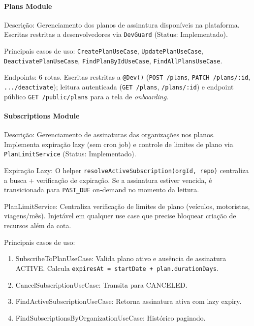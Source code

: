 \paragraph{Plans Module}

Descrição: Gerenciamento dos planos de assinatura disponíveis na plataforma. Escritas restritas a desenvolvedores via \texttt{DevGuard} (Status: Implementado).

Principais casos de uso: \texttt{CreatePlanUseCase}, \texttt{UpdatePlanUseCase}, \texttt{DeactivatePlanUseCase}, \texttt{FindPlanByIdUseCase}, \texttt{FindAllPlansUseCase}.

Endpoints: 6 rotas. Escritas restritas a \texttt{@Dev()} (\texttt{POST /plans}, \texttt{PATCH /plans/:id}, \texttt{.../deactivate}); leitura autenticada (\texttt{GET /plans}, \texttt{/plans/:id}) e endpoint público \texttt{GET /public/plans} para a tela de \textit{onboarding}.

\paragraph{Subscriptions Module}

Descrição: Gerenciamento de assinaturas das organizações nos planos. Implementa expiração lazy (sem cron job) e controle de limites de plano via \texttt{PlanLimitService} (Status: Implementado).

Expiração Lazy: O helper \texttt{resolveActiveSubscription(orgId, repo)} centraliza a busca + verificação de expiração. Se a assinatura estiver vencida, é transicionada para \texttt{PAST\_DUE} on-demand no momento da leitura.

PlanLimitService: Centraliza verificação de limites de plano (veículos, motoristas, viagens/mês). Injetável em qualquer use case que precise bloquear criação de recursos além da cota.

Principais casos de uso:
\begin{enumerate}
\item SubscribeToPlanUseCase: Valida plano ativo e ausência de assinatura ACTIVE. Calcula \texttt{expiresAt = startDate + plan.durationDays}.
\item CancelSubscriptionUseCase: Transita para CANCELED.
\item FindActiveSubscriptionUseCase: Retorna assinatura ativa com lazy expiry.
\item FindSubscriptionsByOrganizationUseCase: Histórico paginado.
\end{enumerate}

